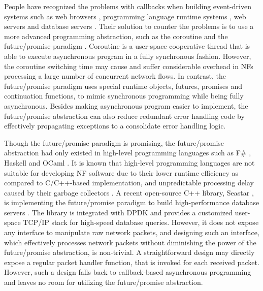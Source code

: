 People have recognized the problems with callbacks when building event-driven systems such as web browsers \cite{gallaba2015don, kambona2013evaluation}, programming language runtime systems \cite{syme2011f}, web servers \cite{tornado-web-server} and database servers \cite{rethinkdb}. Their solution to counter the problems is to use a more advanced programming abstraction, such as the coroutine \cite{coroutine} and the future/promise paradigm
\cite{li2007combining, claessen1999poor, wtf}. Coroutine is a user-space cooperative thread that is able to execute asynchronous program in a fully synchronous fashion. %
 However, the coroutine switching time may cause and suffer considerable overhead in NFs processing a large number of concurrent network flows.
In contrast, the future/promise paradigm uses special runtime objects, futures, promises and continuation functions, to mimic synchronous programming while being fully asynchronous. Besides making asynchronous program easier to implement, the future/promise abstraction can also reduce redundant error handling code by effectively propagating exceptions to a consolidate error handling logic.%


Though the future/promise paradigm is promising, the future/promise abstraction had only existed in high-level programming languages such as F\# \cite{syme2011f}, Haskell \cite{li2007combining} and OCaml \cite{wtf}. It is known that high-level programming languages are not suitable for developing NF software due to their lower runtime efficiency as compared to C/C++-based implementation, and unpredictable processing delay caused by their garbage collectors \cite{199352}. A recent open-source C++ library, Seastar \cite{seastar}, is implementing the future/promise paradigm to build high-performance database servers \cite{scylladb}. The library is integrated with DPDK and provides a customized user-space TCP/IP stack for high-speed database queries. However, it does not expose any interface to manipulate raw network packets, and designing such an interface, which effectively processes network packets without diminishing the power of the future/promise abstraction, is non-trivial. A straightforward design may directly expose a regular packet handler function, that is invoked for each received packet. However, such a design falls back to callback-based asynchronous programming and leaves no room for utilizing the future/promise abstraction.


